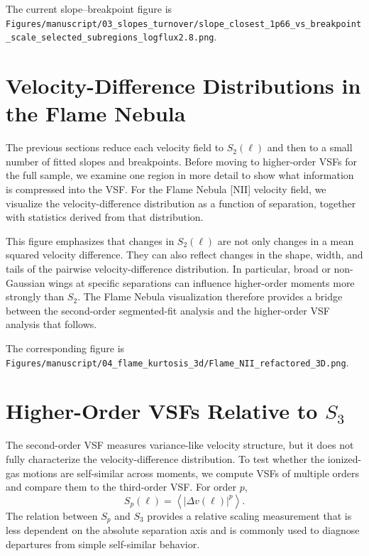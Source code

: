 The current slope--breakpoint figure is
\texttt{Figures/manuscript/03\_slopes\_turnover/slope\_closest\_1p66\_vs\_breakpoint\_scale\_selected\_subregions\_logflux2.8.png}.

\section{Velocity-Difference Distributions in the Flame Nebula}
\label{sec:flame-3d}

The previous sections reduce each velocity field to $S_2(\ell)$ and then to a
small number of fitted slopes and breakpoints. Before moving to higher-order
VSFs for the full sample, we examine one region in more detail to show what
information is compressed into the VSF. For the Flame Nebula [NII] velocity
field, we visualize the velocity-difference distribution as a function of
separation, together with statistics derived from that distribution.

This figure emphasizes that changes in $S_2(\ell)$ are not only changes in a
mean squared velocity difference. They can also reflect changes in the shape,
width, and tails of the pairwise velocity-difference distribution. In
particular, broad or non-Gaussian wings at specific separations can influence
higher-order moments more strongly than $S_2$. The Flame Nebula visualization
therefore provides a bridge between the second-order segmented-fit analysis and
the higher-order VSF analysis that follows.

The corresponding figure is
\texttt{Figures/manuscript/04\_flame\_kurtosis\_3d/Flame\_NII\_refactored\_3D.png}.

\section{Higher-Order VSFs Relative to $S_3$}
\label{sec:higher-order-vsfs}

The second-order VSF measures variance-like velocity structure, but it does not
fully characterize the velocity-difference distribution. To test whether the
ionized-gas motions are self-similar across moments, we compute VSFs of
multiple orders and compare them to the third-order VSF. For order $p$,
\begin{equation}
    S_p(\ell)
    =
    \left\langle
    \left| \Delta v(\ell) \right|^p
    \right\rangle .
\end{equation}
The relation between $S_p$ and $S_3$ provides a relative scaling measurement
that is less dependent on the absolute separation axis and is commonly used to
diagnose departures from simple self-similar behavior.

